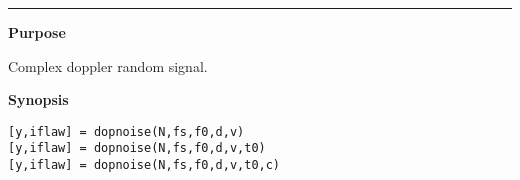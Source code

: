


\hspace*{-1.6cm}{\Large \bf dopnoise}

\vspace*{-.4cm}
\hspace*{-1.6cm}\rule[0in]{16.5cm}{.02cm}
\vspace*{.2cm}



{\bf \large {}\selectfont Purpose}\\
\hspace*{1.5cm}
\begin{minipage}[t]{13.5cm}
Complex doppler random signal.
\end{minipage}
\vspace*{.5cm}


{\bf \large {}\selectfont Synopsis}\\
\hspace*{1.5cm}
\begin{minipage}[t]{13.5cm}
\begin{verbatim}
[y,iflaw] = dopnoise(N,fs,f0,d,v)
[y,iflaw] = dopnoise(N,fs,f0,d,v,t0)
[y,iflaw] = dopnoise(N,fs,f0,d,v,t0,c)
\end{verbatim}
\end{minipage}
\vspace*{.5cm}



